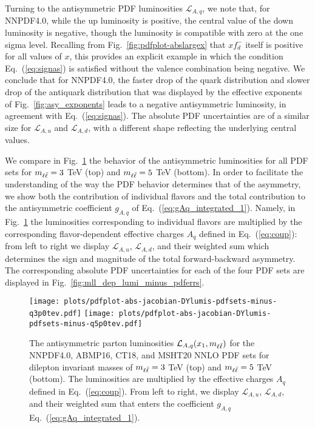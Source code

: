 Turning to the antisymmetric PDF luminosities $\mathcal{L}_{A,q}$,
we note  that, for NNPDF4.0, while the up luminosity is
positive, the central value of the down luminosity is negative, though
the luminosity is compatible with zero at the one sigma level.
%
Recalling
from Fig.~\ref{fig:pdfplot-abslargex} that $xf_{d}^-$ itself is
positive for all values of $x$,  this provides an explicit example in
which the condition Eq.~(\ref{eq:signas}) is satisfied without the valence
combination being negative.
%
We conclude that for NNPDF4.0, the faster
drop of the quark distribution and slower drop of the antiquark
distribution that was displayed by the effective exponents of
Fig.~\ref{fig:asy_exponents} leads to a negative antisymmetric
luminosity, in agreement with Eq.~(\ref{eq:signas}).
The absolute PDF uncertainties are of a similar size for
$\mathcal{L}_{A,u}$ and $\mathcal{L}_{A,d}$, with a different shape
reflecting the underlying central values.

We compare
in Fig.~\ref{fig:mll_dep_lumi_minus}
the behavior of the antisymmetric luminosities for all PDF
sets for $m_{\ell\bar{\ell}}=3$ TeV (top) and $m_{\ell\bar{\ell}}=5$ TeV (bottom).
%
In order to facilitate the understanding of the way the PDF behavior
determines that of the asymmetry, we show both the contribution of
individual flavors and the total contribution
to the antisymmetric coefficient $g_{A,q}$ of
Eq.~(\ref{eq:gAq_integrated_1}). Namely, in
Fig.~\ref{fig:mll_dep_lumi_minus} the luminosities corresponding to
individual flavors are multiplied by the corresponding flavor-dependent
effective charges $A_q$ defined in Eq.~(\ref{eq:coup}):
from left to right we display $\mathcal{L}_{A,u}$,  $\mathcal{L}_{A,d}$,
and their weighted sum
 which determines
the sign and magnitude of the total forward-backward asymmetry.
%
The corresponding absolute PDF uncertainties for each of the four PDF sets
are displayed in  Fig.~\ref{fig:mll_dep_lumi_minus_pdferrs}.

\begin{figure}[!t]
 \centering
 \texttt{[image: plots/pdfplot-abs-jacobian-DYlumis-pdfsets-minus-q3p0tev.pdf]}
 \texttt{[image: plots/pdfplot-abs-jacobian-DYlumis-pdfsets-minus-q5p0tev.pdf]}
 \caption{The antisymmetric 
   parton luminosities $\mathcal{L}_{A,q}(x_1,m_{\ell\bar{\ell}})$ for the NNPDF4.0, ABMP16,
   CT18, and MSHT20 NNLO PDF sets for dilepton
   invariant masses of
   $m_{\ell\bar{\ell}}=3$ TeV (top) and $m_{\ell\bar{\ell}}=5$ TeV (bottom).
   The luminosities are multiplied by the effective charges
   $A_q$ defined in Eq.~(\ref{eq:coup}).
   From left to right, we display $\mathcal{L}_{A,u}$,  $\mathcal{L}_{A,d}$,
   and their weighted sum that enters the  coefficient $g_{A,q}$ Eq.~(\ref{eq:gAq_integrated_1}).
    }    
 \label{fig:mll_dep_lumi_minus}
\end{figure}

